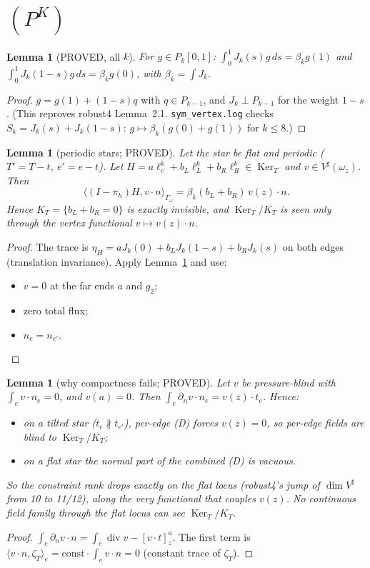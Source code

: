\documentclass[11pt]{article}
\newtheorem{lemma}[theorem]{Lemma}
\theoremstyle{remark}
\newcommand{\ip}[2]{\langle #1,#2\rangle}
\begin{document}
\section{$(P^K)$}
\begin{lemma}[PROVED, all $k$]\label{lem:J}
For $g\in P_k[0,1]$: $\int_0^1J_k(s)g\,ds=\beta_kg(1)$ and $\int_0^1J_k(1-s)g\,ds=\beta_kg(0)$, with $\beta_k=\int J_k$.
\end{lemma}
\begin{proof}
$g=g(1)+(1-s)q$ with $q\in P_{k-1}$, and $J_k\perp P_{k-1}$ for the weight $1-s$. (This reproves robust4 Lemma~2.1.
\texttt{sym\_vertex.log} checks $S_k=J_k(s)+J_k(1-s)$: $g\mapsto\beta_k(g(0)+g(1))$ for $k\le8$.)
\end{proof}

\begin{lemma}[periodic stars; PROVED]\label{lem:K1}
Let the star be flat and periodic ($T'=T-t$, $e'=e-t$). Let $H=a\ell_c^k+b_L\ell_L^k+b_R\ell_R^k\in\operatorname{Ker}_T$ and $v\in V^\sharp(\omega_z)$. Then
\[
\ip{(I-\pi_h)H}{v\cdot n}_{\Gamma_\omega}=\beta_k(b_L+b_R)\,v(z)\cdot n .
\]
Hence $K_T=\{b_L+b_R=0\}$ is exactly invisible, and $\operatorname{Ker}_T/K_T$ is seen only through the vertex functional $v\mapsto v(z)\cdot n$.
\end{lemma}
\begin{proof}
The trace is $\eta_H=aJ_k(0)+b_LJ_k(1-s)+b_RJ_k(s)$ on both edges (translation invariance). Apply Lemma~\ref{lem:J} and use:
\begin{itemize}
\item $v=0$ at the far ends $a$ and $g_2$;
\item zero total flux;
\item $n_e=n_{e'}$.
\end{itemize}
\end{proof}

\begin{lemma}[why compactness fails; PROVED]\label{lem:K2}
Let $v$ be pressure-blind with $\int_ev\cdot n_e=0$, and $v(a)=0$. Then $\int_e\partial_nv\cdot n_e=v(z)\cdot t_e$. Hence:
\begin{itemize}
\item on a tilted star ($t_e\nparallel t_{e'}$), per-edge (D) forces $v(z)=0$, so per-edge fields are blind to $\operatorname{Ker}_T/K_T$;
\item on a flat star the normal part of the \emph{combined} (D) is vacuous.
\end{itemize}
So the constraint rank drops exactly on the flat locus (robust4's jump of $\dim V^\sharp$ from 10 to 11/12), along the very functional
that couples $v(z)$. No continuous field family through the flat locus can see $\operatorname{Ker}_T/K_T$.
\end{lemma}
\begin{proof}
$\int_e\partial_nv\cdot n=\int_e\operatorname{div}v-[v\cdot t]_z^a$. The first term is $\ip{v\cdot n}{\zeta_T}_e=\mathrm{const}\cdot\int_ev\cdot n=0$
(constant trace of $\zeta_T$).
\end{proof}
\end{document}
